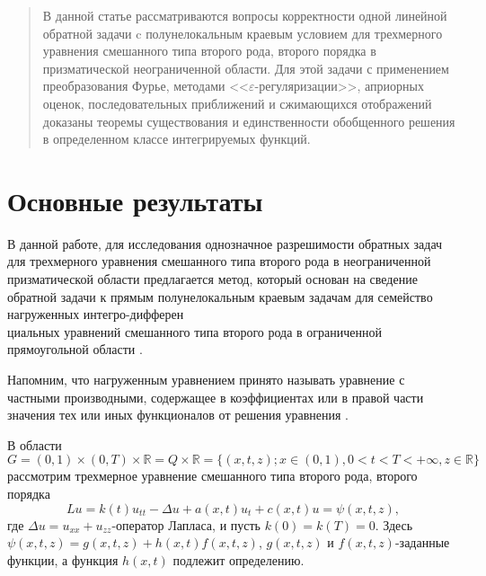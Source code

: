 \maketitle

\begin{abstract}
В данной статье рассматриваются вопросы корректности одной линейной обратной задачи c полунелокальным краевым условием для трехмерного уравнения смешанного типа второго рода, второго порядка в призматической неограниченной области. Для этой задачи с применением преобразования Фурье, методами <<$\varepsilon$-регуляризации>>, априорных оценок, последовательных приближений и сжимающихся отображений доказаны теоремы существования и единственности обобщенного решения в определенном классе интегрируемых функций.

\end{abstract}

\section{Основные результаты} %

В данной работе, для исследования однозначное разрешимости обратных задач для трехмерного уравнения смешанного типа второго рода в неограниченной призматической области предлагается метод, который основан на сведение обратной задачи к прямым полунелокальным краевым задачам для  семейство нагруженных интегро-дифферен \\циальных уравнений смешанного типа второго рода в ограниченной прямоугольной области \cite{Dzhamalov1,Dzhamalov2,Dzhamalov3}.

Напомним, что нагруженным уравнением принято называть уравнение с частными производными, содержащее в коэффициентах или в правой части значения тех или иных функционалов от решения уравнения \cite{Nakhushev}.

В области
$$G=(0,1)\times (0,T)\times \mathbb{R}=Q\times \mathbb{R}=\{(x,t,z);x\in (0,1),0<t<T<+\infty , z\in \mathbb{R}\}$$
рассмотрим трехмерное уравнение смешанного типа второго рода, второго порядка
 \begin{equation}\label{1}
Lu=k(t)u_{tt}-\Delta u +a(x,t)u_{t}+ c(x,t)u=\psi (x,t,z),
 \end{equation}
где $\Delta u=u_{xx}+u_{zz}$-оператор Лапласа, и пусть  $k(0)=k(T)=0$. Здесь $\psi (x,t,z)=g(x,t,z)+h(x,t)f(x,t,z)$,  $g(x,t,z)$ и $f(x,t,z)$-заданные функции, а функция  $h(x,t)$ подлежит определению.


